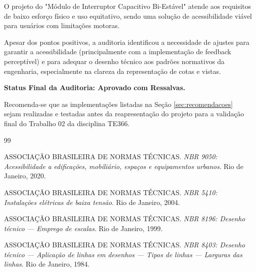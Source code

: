 \documentclass[12pt, openright, a4paper, openany, oneside, chapter=TITLE, section=TITLE, subsection=TITLE, subsubsection=TITLE, subsubsubsection=TITLE, subsubsubsection=TITLE, brazil]{abntex2}
\begin{document}
O projeto do "Módulo de Interruptor Capacitivo Bi-Estável" atende aos requisitos de baixo esforço físico e uso equitativo, sendo uma solução de acessibilidade viável para usuários com limitações motoras.
\par
Apesar dos pontos positivos, a auditoria identificou a necessidade de ajustes para garantir a acessibilidade (principalmente com a implementação de feedback perceptível) e para adequar o desenho técnico aos padrões normativos da engenharia, especialmente na clareza da representação de cotas e vistas.
\par
\vspace{0.5cm}
\noindent \textbf{Status Final da Auditoria: Aprovado com Ressalvas.}
\par
\vspace{0.2cm}
\noindent Recomenda-se que as implementações listadas na Seção \ref{sec:recomendacoes} sejam realizadas e testadas antes da reapresentação do projeto para a validação final do Trabalho 02 da disciplina TE366.

\begin{thebibliography}{99}

ASSOCIAÇÃO BRASILEIRA DE NORMAS TÉCNICAS. \textit{NBR 9050: Acessibilidade a edificações, mobiliário, espaços e equipamentos urbanos}. Rio de Janeiro, 2020.

ASSOCIAÇÃO BRASILEIRA DE NORMAS TÉCNICAS. \textit{NBR 5410: Instalações elétricas de baixa tensão}. Rio de Janeiro, 2004.

ASSOCIAÇÃO BRASILEIRA DE NORMAS TÉCNICAS. \textit{NBR 8196: Desenho técnico — Emprego de escalas}. Rio de Janeiro, 1999.

ASSOCIAÇÃO BRASILEIRA DE NORMAS TÉCNICAS. \textit{NBR 8403: Desenho técnico — Aplicação de linhas em desenhos — Tipos de linhas — Larguras das linhas}. Rio de Janeiro, 1984.

\end{thebibliography}

\end{document}
